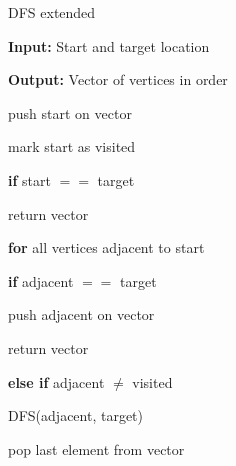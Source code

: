 \documentclass[../Head/Main.tex]{subfiles}
\begin{document}
\begin{Pseudo}{DFS extended}{}

\textbf{Input:} Start and target location 

\textbf{Output:} Vector of vertices in order


	\begin{Indentation}
		\item push start on vector 
		\item mark start as visited 
		\item[ ] 
		\item \textbf{if} start $==$ target
		\item return vector
		\item[ ]
		\item \textbf{for} all vertices adjacent to start
		\item \textbf{if} adjacent $==$ target
		\item push adjacent on vector 
		\item return vector
		\item[ ]
		\item \textbf{else if} adjacent $\neq$ visited
		\item DFS(adjacent, target)
		\item pop last element from vector 
	\end{Indentation}
	
	
\end{Pseudo} 
\end{document}
